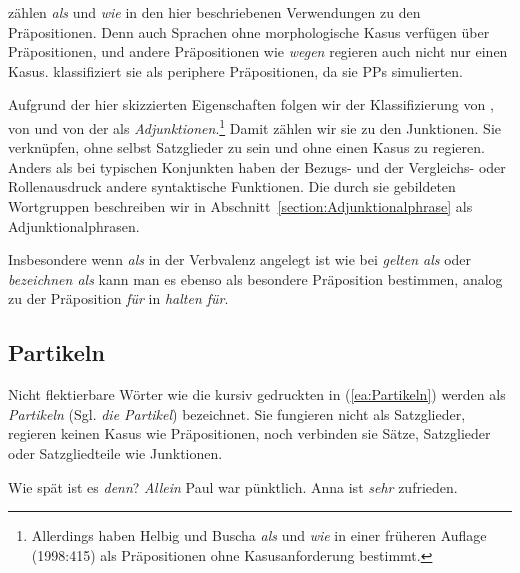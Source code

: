 \citet[272--273]{Hentschel_Weydt2021} zählen \textit{als} und \textit{wie} in den hier beschriebenen Verwendungen zu den Präpositionen. Denn auch Sprachen ohne morphologische Kasus verfügen über Präpositionen, und andere Präpositionen wie \textit{wegen} regieren auch nicht nur einen Kasus. \citet[739--740]{Agel2017} klassifiziert sie als periphere Präpositionen, da sie PPs simulierten.

Aufgrund der hier skizzierten Eigenschaften folgen wir der Klassifizierung von \citet[990--991, 1005--1007]{ZifHoffStr1997}, von \citet[353]{HelbigBuscha} und von der \citet[822, §1454]{Duden2022} als \textit{Adjunktionen}.\footnote{Allerdings haben Helbig und Buscha \textit{als} und \textit{wie} in einer früheren Auflage (1998:415) als Präpositionen ohne Kasusanforderung bestimmt.} Damit zählen wir sie zu den Junktionen. Sie verknüpfen, ohne selbst Satzglieder zu sein und ohne einen Kasus zu regieren. Anders als bei typischen Konjunkten haben der Bezugs- und der Vergleichs- oder Rollenausdruck andere syntaktische Funktionen. Die durch sie gebildeten Wortgruppen beschreiben wir in Abschnitt~\ref{section:Adjunktionalphrase} als Adjunktionalphrasen.

Insbesondere wenn \textit{als} in der Verbvalenz angelegt ist wie bei \textit{gelten als} oder \textit{bezeichnen als} kann man es ebenso als besondere Präposition bestimmen, analog zu der Präposition \textit{für} in \textit{halten für}. 


\subsection{Partikeln}\label{subsection:Partikeln}

Nicht flektierbare Wörter wie die kursiv gedruckten in (\ref{ea:Partikeln}) werden als \textit{Partikeln} (Sgl. \textit{die Partikel}) bezeichnet. Sie fungieren nicht als Satzglieder, regieren keinen Kasus wie Präpositionen, noch verbinden sie Sätze, Satzglieder oder Satzgliedteile wie Junktionen.

\ea \label{ea:Partikeln}
\ea \label{ea:denn_Par} Wie spät ist es \textit{denn}?
\ex \label{ex:allein_Part} \textit{Allein} Paul war pünktlich.
\ex \label{ex:sehr_Part} Anna ist \textit{sehr} zufrieden.
\z 
\z 

